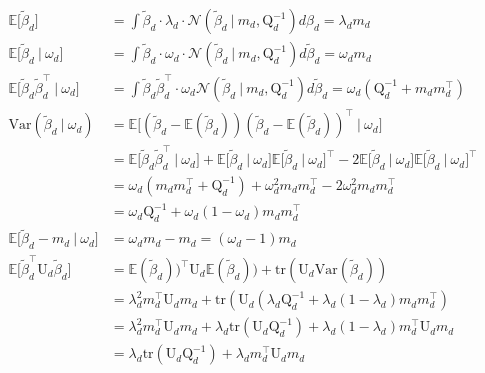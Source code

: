 \documentclass[twoside,11pt]{article}
\newcommand\given[1][]{\:#1\vert\:}
\newcommand{\transpose}[1]{#1^{\intercal}}
\newcommand{\E}{\mathbb{E}}
\newcommand{\betad}{\tilde{\beta}_d}
\newcommand{\umat}{\mathrm{U}}
\newcommand{\qmat}{\mathrm{Q}}
\newcommand{\qbeta}{\mathcal{N} \left( \betad \given m_d, \qmat_d^{-1} \right)}
\newcommand{\trace}[1]{\mathrm{tr} \left( #1 \right)}
\newcommand{\var}[1]{\mathrm{Var}\left(#1\right)}
\begin{document}
\begin{align*}
	\E \Big[ \betad \Big] &= \int \betad \cdot  \lambda_d \cdot \qbeta d\beta_d = \lambda_d m_d \\
	\E \Big[ \betad \given \omega_d \Big] &= \int  \betad \cdot \omega_d \cdot \qbeta d \betad = \omega_d m_d \\
	\E \Big[ \betad \transpose{\betad} \given \omega_d \Big] &= \int \betad \transpose{\betad} \cdot \omega_d \qbeta d\betad  = \omega_d \left( \qmat_d^{-1} + m_d \transpose{m_d} \right) \\
	\var{\betad \given \omega_d} &= \E\Big[  (\betad - \E(\betad))\transpose{(\betad - \E(\betad))} \given \omega_d \Big] \\
	&= \E\Big[\betad \transpose{\betad} \given \omega_d \Big] + \E \Big[ \betad \given \omega_d \Big] \transpose{\E \Big[ \betad \given \omega_d \Big]} - 2 \E \Big[ \betad \given \omega_d \Big] \transpose{\E \Big[ \betad \given \omega_d \Big]} \\
	&= \omega_d \left( m_d \transpose{m_d} + \qmat_d^{-1} \right) + \omega_d^2 m_d \transpose{m_d} - 2\omega_d^2 m_d\transpose{m_d} \\
	&= \omega_d \qmat_d^{-1} + \omega_d(1-\omega_d) m_d \transpose{m_d} \\
	\E\Big[ \betad - m_d \given \omega_d \Big] &= \omega_d m_d - m_d = (\omega_d - 1) m_d \\
	\E \Big[ \transpose{\betad} \umat_d \betad \Big] &= \transpose{\E(\betad))} \umat_d \E(\betad)) + \trace{\umat_d \var{\betad}} \\
	&= \lambda_d^2 \transpose{m_d} \umat_d m_d + \trace{\umat_d \left( \lambda_d \qmat_d^{-1} + \lambda_d(1-\lambda_d)m_d \transpose{m_d}} \\
	&= \lambda_d^2 \transpose{m_d} \umat_d m_d + \lambda_d \trace{\umat_d\qmat_d^{-1}} + \lambda_d(1 - \lambda_d)\transpose{m_d}\umat_dm_d \\
	&= \lambda_d \trace{\umat_d \qmat_d^{-1}} + \lambda_d \transpose{m_d} \umat_d m_d
\end{align*}

\newpage
\end{document}
